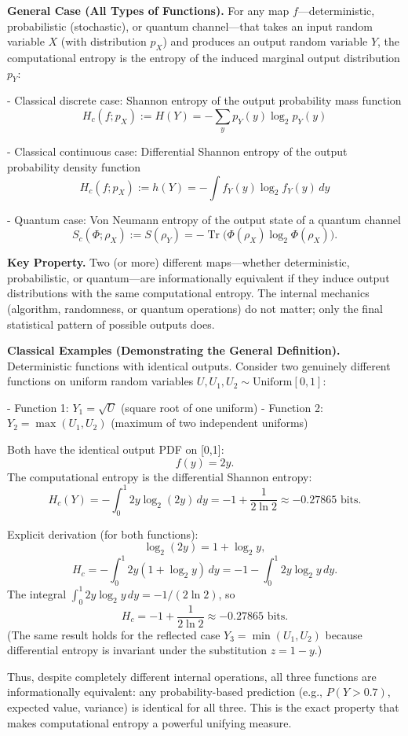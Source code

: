 \documentclass[reprint,amsmath,amssymb,aps,prd,preprintnumbers,superscriptaddress,longbibliography,10pt]{revtex4-2}
\begin{document}
\textbf{General Case (All Types of Functions).} For any map \(f\)—deterministic, probabilistic (stochastic), or quantum channel—that takes an input random variable \(X\) (with distribution \(p_X\)) and produces an output random variable \(Y\), the computational entropy is the entropy of the induced marginal output distribution \(p_Y\):

- Classical discrete case: Shannon entropy of the output probability mass function
\[
H_c(f; p_X) := H(Y) = -\sum_y p_Y(y) \log_2 p_Y(y)
\]

- Classical continuous case: Differential Shannon entropy of the output probability density function
\[
H_c(f; p_X) := h(Y) = -\int f_Y(y) \log_2 f_Y(y) \, dy
\]

- Quantum case: Von Neumann entropy of the output state of a quantum channel
\[
S_c(\Phi; \rho_X) := S(\rho_Y) = -\operatorname{Tr}\bigl(\Phi(\rho_X) \log_2 \Phi(\rho_X)\bigr).
\]

\textbf{Key Property.} Two (or more) different maps—whether deterministic, probabilistic, or quantum—are informationally equivalent if they induce output distributions with the same computational entropy. The internal mechanics (algorithm, randomness, or quantum operations) do not matter; only the final statistical pattern of possible outputs does.

\textbf{Classical Examples (Demonstrating the General Definition).} Deterministic functions with identical outputs. Consider two genuinely different functions on uniform random variables \(U, U_1, U_2 \sim \text{Uniform}[0,1]\):

- Function 1: \(Y_1 = \sqrt{U}\) (square root of one uniform)
- Function 2: \(Y_2 = \max(U_1, U_2)\) (maximum of two independent uniforms)

Both have the identical output PDF on [0,1]:
\[
f(y) = 2y.
\]
The computational entropy is the differential Shannon entropy:
\[
H_c(Y) = -\int_0^1 2y \log_2 (2y) \, dy = -1 + \frac{1}{2 \ln 2} \approx -0.27865 \text{ bits}.
\]

Explicit derivation (for both functions):
\[
\log_2(2y) = 1 + \log_2 y,
\]
\[
H_c = -\int_0^1 2y(1 + \log_2 y) \, dy = -1 - \int_0^1 2y \log_2 y \, dy.
\]
The integral \(\int_0^1 2y \log_2 y \, dy = -1/(2 \ln 2)\), so
\[
H_c = -1 + \frac{1}{2 \ln 2} \approx -0.27865 \text{ bits}.
\]
(The same result holds for the reflected case \(Y_3 = \min(U_1, U_2)\) because differential entropy is invariant under the substitution \(z = 1 - y\).)

Thus, despite completely different internal operations, all three functions are informationally equivalent: any probability-based prediction (e.g., \(P(Y > 0.7)\), expected value, variance) is identical for all three. This is the exact property that makes computational entropy a powerful unifying measure.
\end{document}
